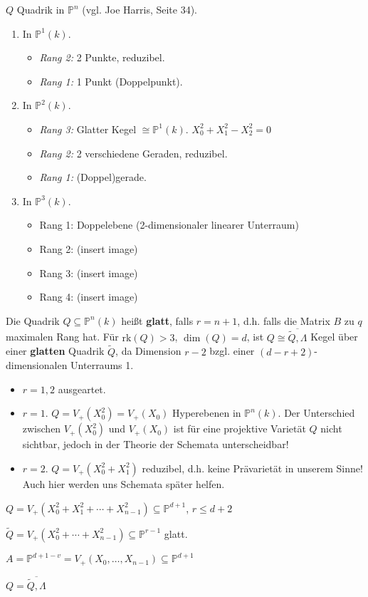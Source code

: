 \begin{example}
  \label{bsp:quadrik-joe-harris}
  $Q$ Quadrik in $\mathbb{P}^{n}$ (vgl. Joe Harris, Seite 34).
  \begin{enumerate}
  \item In $\mathbb{P}^{1}(k)$. 
    \begin{itemize}
    \item \emph{Rang 2:} 2 Punkte, reduzibel. 
    \item \emph{Rang 1:} 1 Punkt (Doppelpunkt). 
    \end{itemize}
  \item In $\mathbb{P}^{2}(k)$.
    \begin{itemize}
    \item \emph{Rang 3:} Glatter Kegel
      $\cong\mathbb{P}^{1}(k)$. $X_{0}^{2}+X_{1}^{2}-X_{2}^{2}=0$
    \item \emph{Rang 2:} 2 verschiedene Geraden, reduzibel. 
    \item \emph{Rang 1:} (Doppel)gerade.
    \end{itemize}
  \item In $\mathbb{P}^{3}(k)$.
    \begin{itemize}
    \item Rang 1: Doppelebene (2-dimensionaler linearer Unterraum)
    \item Rang 2: (insert image)
    \item Rang 3: (insert image)
    \item Rang 4: (insert image)
    \end{itemize}
  \end{enumerate}
\end{example}
Die Quadrik $Q\subseteq\mathbb{P}^{n}(k)$ heißt \textbf{glatt}, falls
$r=n+1$, d.h. falls die Matrix $B$ zu $q$ maximalen Rang hat. Für
$\text{rk}(Q)>3$, $\dim(Q)=d$, ist
$Q\cong\overline{\widetilde{Q},\Lambda}$ Kegel über einer
\textbf{glatten} Quadrik $\widetilde{Q}$, da Dimension $r-2$
bzgl. einer $(d-r+2)$-dimensionalen Unterraums 1.
\begin{itemize}
\item $r=1,2$ ausgeartet.
\item $r=1$. $Q=V_{+}(X_{0}^{2})=V_{+}(X_{0})$ Hyperebenen in
  $\mathbb{P}^{n}(k)$.  Der Unterschied zwischen $V_{+}(X_{0}^{2})$
  und $V_{+}(X_{0})$ ist für eine projektive Varietät $Q$ nicht
  sichtbar, jedoch in der Theorie der Schemata unterscheidbar!
\item $r=2$. $Q=V_{+}(X_{0}^{2}+X_{1}^{2})$ reduzibel, d.h. keine
  Prävarietät in unserem Sinne! Auch hier werden uns Schemata später helfen.
\end{itemize}
\medskip{}

$Q=V_{+}(X_{0}^{2}+X_{1}^{2}+\cdots+X_{n-1}^{2})\subseteq\mathbb{P}^{d+1}$,
$r\leq d+2$

$\tilde{Q}=V_{+}(X_{0}^{2}+\cdots+X_{n-1}^{2})\subseteq\mathbb{P}^{r-1}$
glatt.

$A=\mathbb{P}^{d+1-v}=V_{+}(X_{0},\ldots,X_{n-1})\subseteq\mathbb{P}^{d+1}$

$Q=\overline{\widetilde{Q},\Lambda}$
